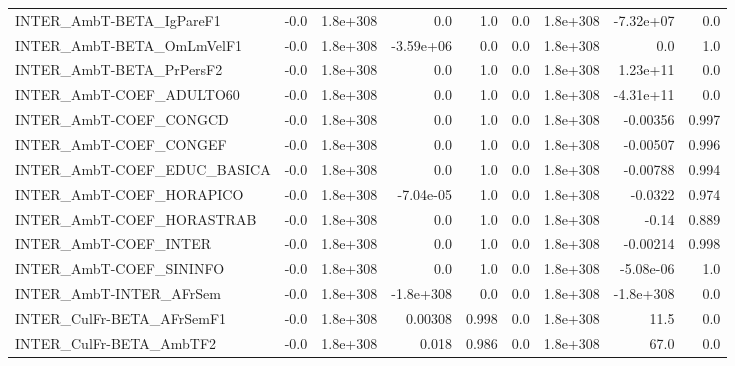 \begin{tabular}{lrrrrrrrr}
INTER\_AmbT-BETA\_IgPareF1              &        -0.0 &     1.8e+308 &        0.0 &      1.0 &        0.0 &    1.8e+308 &    -7.32e+07 &           0.0 \\
INTER\_AmbT-BETA\_OmLmVelF1             &        -0.0 &     1.8e+308 &  -3.59e+06 &      0.0 &        0.0 &    1.8e+308 &          0.0 &           1.0 \\
INTER\_AmbT-BETA\_PrPersF2              &        -0.0 &     1.8e+308 &        0.0 &      1.0 &        0.0 &    1.8e+308 &     1.23e+11 &           0.0 \\
INTER\_AmbT-COEF\_ADULTO60              &        -0.0 &     1.8e+308 &        0.0 &      1.0 &        0.0 &    1.8e+308 &    -4.31e+11 &           0.0 \\
INTER\_AmbT-COEF\_CONGCD                &        -0.0 &     1.8e+308 &        0.0 &      1.0 &        0.0 &    1.8e+308 &     -0.00356 &         0.997 \\
INTER\_AmbT-COEF\_CONGEF                &        -0.0 &     1.8e+308 &        0.0 &      1.0 &        0.0 &    1.8e+308 &     -0.00507 &         0.996 \\
INTER\_AmbT-COEF\_EDUC\_BASICA           &        -0.0 &     1.8e+308 &        0.0 &      1.0 &        0.0 &    1.8e+308 &     -0.00788 &         0.994 \\
INTER\_AmbT-COEF\_HORAPICO              &        -0.0 &     1.8e+308 &  -7.04e-05 &      1.0 &        0.0 &    1.8e+308 &      -0.0322 &         0.974 \\
INTER\_AmbT-COEF\_HORASTRAB             &        -0.0 &     1.8e+308 &        0.0 &      1.0 &        0.0 &    1.8e+308 &        -0.14 &         0.889 \\
INTER\_AmbT-COEF\_INTER                 &        -0.0 &     1.8e+308 &        0.0 &      1.0 &        0.0 &    1.8e+308 &     -0.00214 &         0.998 \\
INTER\_AmbT-COEF\_SININFO               &        -0.0 &     1.8e+308 &        0.0 &      1.0 &        0.0 &    1.8e+308 &    -5.08e-06 &           1.0 \\
INTER\_AmbT-INTER\_AFrSem               &        -0.0 &     1.8e+308 &  -1.8e+308 &      0.0 &        0.0 &    1.8e+308 &    -1.8e+308 &           0.0 \\
INTER\_CulFr-BETA\_AFrSemF1             &        -0.0 &     1.8e+308 &    0.00308 &    0.998 &        0.0 &    1.8e+308 &         11.5 &           0.0 \\
INTER\_CulFr-BETA\_AmbTF2               &        -0.0 &     1.8e+308 &      0.018 &    0.986 &        0.0 &    1.8e+308 &         67.0 &           0.0 \\

\end{tabular}
